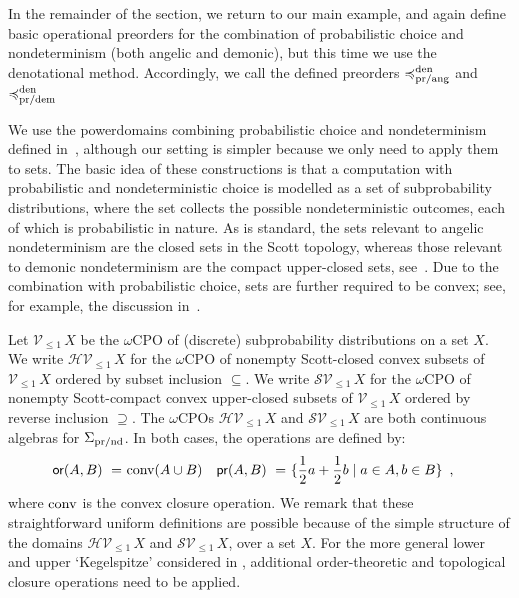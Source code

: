 In the remainder of the section, we return to our main example, and again define basic operational preorders for the combination of probabilistic choice and nondeterminism (both angelic and demonic), but this time we use the denotational method. Accordingly, we call the defined preorders
$\preccurlyeq^{\text{den}}_{\text{pr/ang}}$ and $\preccurlyeq^{\text{den}}_{\text{pr/dem}}$

We use the powerdomains combining probabilistic choice and nondeterminism
defined in~\cite[\S3.4]{KeimelP2016}, although our setting is simpler because we only need to apply them to sets.
The basic idea of these constructions is that a computation with probabilistic and nondeterministic choice is modelled as a set of subprobability distributions, where the set collects the possible nondeterministic outcomes, each of which is probabilistic in nature. As is standard, 
the sets relevant to angelic nondeterminism are the closed sets in the Scott topology, whereas those relevant to demonic nondeterminism are the compact upper-closed sets, see~\cite{smyth}.
Due to the combination with probabilistic choice,  sets are further required to be convex; see, for example, the discussion in~\cite{KeimelP2016}.



Let $\mathcal{V}_{\leq 1} \,X$ be the $\omega$CPO of (discrete) subprobability distributions on a set $X$.
We write $\mathcal{H}\mathcal{V}_{\leq 1} \,X$ for the $\omega$CPO of nonempty Scott-closed convex subsets
of  $\mathcal{V}_{\leq 1} \,X$  ordered by subset inclusion $\subseteq$. 
We write $\mathcal{S}\mathcal{V}_{\leq 1} \,X$ for the $\omega$CPO of nonempty Scott-compact convex upper-closed subsets
of  $\mathcal{V}_{\leq 1} \,X$  ordered by reverse inclusion $\supseteq$.
The $\omega$CPOs $\mathcal{H}\mathcal{V}_{\leq 1} \,X$ and $\mathcal{S}\mathcal{V}_{\leq 1} \,X$ are both continuous algebras for $\Sigma_{\text{pr/nd}}$. In both cases, the operations are defined by:
\begin{align*}
\operatorname{\textsf{or}}(A,B) ~ = ~ & \text{conv}(A \cup B)  
& 
\operatorname{\textsf{pr}}(A,B) ~ = ~ & \{\frac{1}{2}a + \frac{1}{2}b \mid a \in A, b \in B\} \enspace ,
\end{align*}
where $\text{conv}$ is the convex closure operation. 
We remark that these straightforward uniform definitions are possible because of the simple structure of the 
domains  $\mathcal{H}\mathcal{V}_{\leq 1} \,X$ and $\mathcal{S}\mathcal{V}_{\leq 1} \,X$, over a set $X$. For the more general 
lower and upper `Kegelspitze' considered in \cite{KeimelP2016}, additional order-theoretic and topological closure operations need to be applied.

